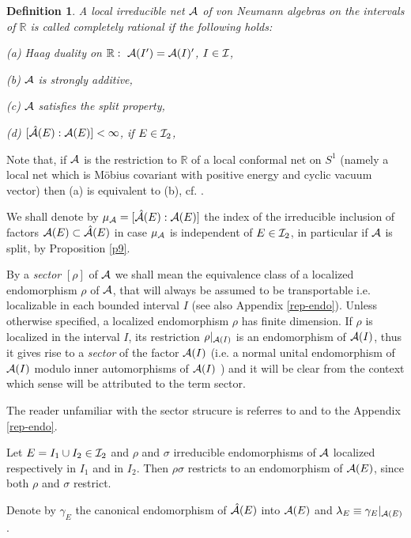 \documentclass[12pt]{article}
\newtheorem{definition}[theorem]{Definition}
\def\A{{\cal A}}
\def\I{{\cal I}}
\def\R{{\mathbb R}}
\begin{document}
\begin{definition}
A local irreducible net $\A$ of von Neumann algebras on the intervals of 
$\R$ is called {\it completely rational} if the following holds:
\begin{description}
\item{\rm (a)} Haag duality on $\R: \ \A(I')=\A(I)'$, $I\in \I$,
\item{\rm (b)} $\A$ is strongly additive,
\item{\rm (c)} $\A$ satisfies the split property,
\item{\rm (d)}  $[\hat \A(E):\A(E)]<\infty$, if $E\in\I_2$,
\end{description}
\end{definition}

Note that, if $\A$ is the restriction to $\mathbb R$ of a 
local conformal net on $S^1$ (namely a local net which is M\"obius 
covariant with positive energy and cyclic vacuum vector) then (a) is 
equivalent to (b), cf. \cite{GLW}.

We shall denote by $\mu_\A=[\hat \A(E):\A(E)]$ the index of the
irreducible
inclusion of factors $\A(E)\subset \hat \A(E)$ in case $\mu_\A$ is
independent
of $E\in\I_2$, in particular if $\A$ is split, by Proposition
\ref{p9}.

By a {\it sector} $[\rho]$ of $\A$ we shall mean the equivalence class 
of a localized endomorphism $\rho$ of $\A$, that will always be 
assumed to be transportable i.e.  localizable in each bounded 
interval $I$ (see also Appendix \ref{rep-endo}).  Unless otherwise 
specified, a localized endomorphism $\rho$ has finite dimension.  If 
$\rho$ is localized in the interval $I$, its restriction 
$\rho|_{\A(I)}$ is an endomorphism of $\A(I)$, thus it gives rise to a 
{\it sector} of the factor $\A(I)$ (i.e.  a normal unital endomorphism 
of $\A(I)$ modulo inner automorphisms of $\A(I)$ \cite{L2}) and it 
will be clear from the context which sense will be attributed to the 
term sector.

The reader unfamiliar with the sector strucure is referres to 
\cite{L2,LR,GL} and to the Appendix \ref{rep-endo}.

Let $E=I_1\cup I_2\in \I_2$ and $\rho$ and $\sigma$ irreducible
endomorphisms of $\A$ localized respectively in $I_1$ and in $I_2$.
Then $\rho\sigma$ restricts to an endomorphism of
$\A(E)$, since both $\rho$ and $\sigma$  restrict.

Denote by $\gamma_E$ the canonical endomorphism of $\hat \A(E)$ into
$\A(E)$ and $\lambda_E\equiv\gamma_E\vert_{\A(E)}$.
\end{document}
